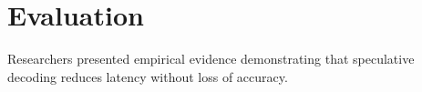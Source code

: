 \section{Evaluation}
Researchers presented empirical evidence demonstrating that speculative decoding reduces latency without loss of accuracy.
